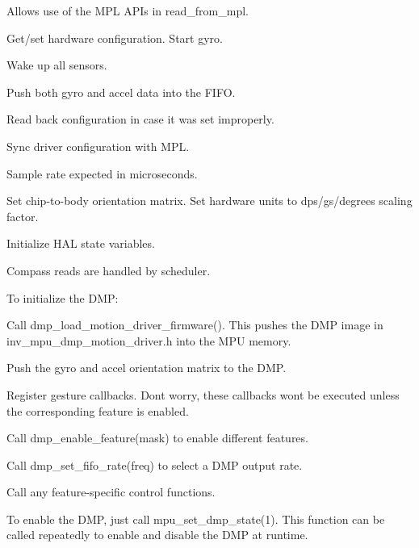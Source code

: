 Allows use of the M\+PL A\+P\+Is in read\+\_\+from\+\_\+mpl.

Get/set hardware configuration. Start gyro.

Wake up all sensors.

Push both gyro and accel data into the F\+I\+FO.

Read back configuration in case it was set improperly.

Sync driver configuration with M\+PL.

Sample rate expected in microseconds.

Set chip-\/to-\/body orientation matrix. Set hardware units to dps/g\textquotesingle{}s/degrees scaling factor.

Initialize H\+AL state variables.

Compass reads are handled by scheduler.

To initialize the D\+MP\+:
\begin{DoxyEnumerate}
\item Call dmp\+\_\+load\+\_\+motion\+\_\+driver\+\_\+firmware(). This pushes the D\+MP image in inv\+\_\+mpu\+\_\+dmp\+\_\+motion\+\_\+driver.\+h into the M\+PU memory.
\item Push the gyro and accel orientation matrix to the D\+MP.
\item Register gesture callbacks. Don\textquotesingle{}t worry, these callbacks won\textquotesingle{}t be executed unless the corresponding feature is enabled.
\item Call dmp\+\_\+enable\+\_\+feature(mask) to enable different features.
\item Call dmp\+\_\+set\+\_\+fifo\+\_\+rate(freq) to select a D\+MP output rate.
\item Call any feature-\/specific control functions.
\end{DoxyEnumerate}

To enable the D\+MP, just call mpu\+\_\+set\+\_\+dmp\+\_\+state(1). This function can be called repeatedly to enable and disable the D\+MP at runtime.

